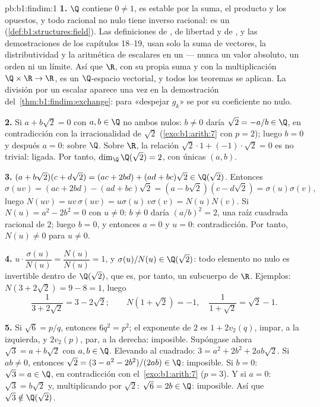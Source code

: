 \begin{solution}{pb:b1:findim:1}
\textbf{1.} $\Q$ contiene $0 \neq 1$, es estable por la suma, el
producto y los opuestos, y todo racional no nulo tiene inverso
racional: es un  (\cref{def:b1:structures:field}). Las
definiciones de , de libertad y de , y las
demostraciones de los capítulos 18--19, usan solo la suma de
vectores, la distributividad y la aritmética de escalares en un
 --- nunca un valor absoluto, un orden ni un límite. Así que
$\R$, con su propia suma y con la multiplicación
$\Q \times \R \to \R$, es un $\Q$-espacio vectorial, y todos los
teoremas se aplican. La división por un escalar aparece una vez en la
demostración del~\cref{thm:b1:findim:exchange}: para «despejar $g_k$»
se  por su coeficiente no nulo.

\textbf{2.} Si $a + b\sqrt2 = 0$ con $a, b \in \Q$ no ambos nulos:
$b \neq 0$ daría $\sqrt2 = -a/b \in \Q$, en contradicción con la
irracionalidad de $\sqrt2$ (\cref{exo:b1:arith:7} con $p = 2$); luego
$b = 0$ y después $a = 0$:  sobre $\Q$. Sobre $\R$, la relación
$\sqrt2\cdot 1 + (-1)\cdot\sqrt2 = 0$ es no trivial: ligada. Por
tanto, $\dim_\Q \Q(\sqrt2) = 2$, con  únicas $(a, b)$.

\textbf{3.} $(a + b\sqrt2)(c + d\sqrt2) = (ac + 2bd) + (ad +
bc)\sqrt2 \in \Q(\sqrt2)$. Entonces
\[
\sigma(uv) = (ac + 2bd) - (ad + bc)\sqrt2
= (a - b\sqrt2)(c - d\sqrt2) = \sigma(u)\sigma(v),
\]
luego $N(uv) = uv\,\sigma(uv) = u\sigma(u)\,v\sigma(v) = N(u)N(v)$.
Si $N(u) = a^2 - 2b^2 = 0$ con $u \neq 0$: $b \neq 0$ daría
$(a/b)^2 = 2$, una raíz cuadrada racional de $2$; luego $b = 0$, y
entonces $a = 0$ y $u = 0$: contradicción. Por tanto,
$N(u) \neq 0$ para $u \neq 0$.

\textbf{4.} $u \cdot \dfrac{\sigma(u)}{N(u)} = \dfrac{N(u)}{N(u)}
= 1$, y $\sigma(u)/N(u) \in \Q(\sqrt2)$: todo elemento no nulo es
invertible dentro de $\Q(\sqrt2)$, que es, por tanto, un subcuerpo
de $\R$. Ejemplos: $N(3 + 2\sqrt2) = 9 - 8 = 1$, luego
\[
\frac1{3 + 2\sqrt2} = 3 - 2\sqrt2 ;
\qquad
N(1 + \sqrt2) = -1, \quad
\frac1{1 + \sqrt2} = \sqrt2 - 1 .
\]

\textbf{5.} Si $\sqrt6 = p/q$, entonces $6q^2 = p^2$; el exponente de
$2$ es $1 + 2v_2(q)$, impar, a la izquierda, y $2v_2(p)$, par, a la
derecha: imposible. Supóngase ahora $\sqrt3 = a + b\sqrt2$ con
$a, b \in \Q$. Elevando al cuadrado:
$3 = a^2 + 2b^2 + 2ab\sqrt2$. Si $ab \neq 0$, entonces
$\sqrt2 = (3 - a^2 - 2b^2)/(2ab) \in \Q$: imposible. Si $b = 0$:
$\sqrt3 = a \in \Q$, en contradicción con
el~\cref{exo:b1:arith:7} ($p = 3$). Y si $a = 0$: $\sqrt3 = b\sqrt2$
y, multiplicando por $\sqrt2$: $\sqrt6 = 2b \in \Q$: imposible. Así
que $\sqrt3 \notin \Q(\sqrt2)$.


\end{solution}
